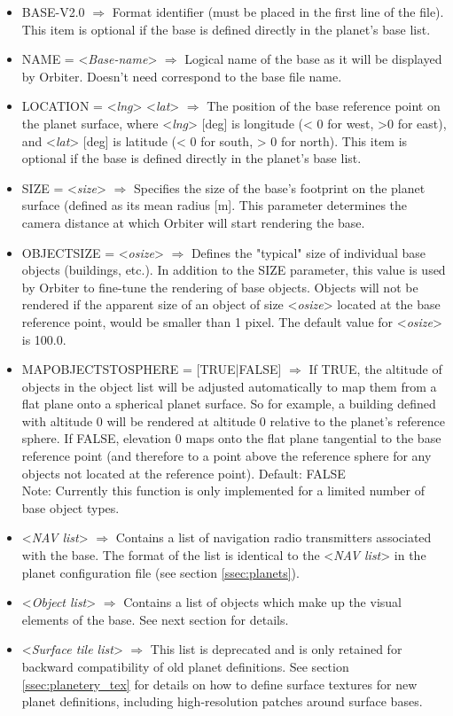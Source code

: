 \documentclass[Orbiter Developer Manual.tex]{subfiles}
\begin{document}
\begin{itemize}
\item BASE-V2.0 $\Rightarrow$ Format identifier (must be placed in the first line of the file). This item is optional if the base is defined directly in the planet's base list.
\item NAME = <\textit{Base-name}> $\Rightarrow$ Logical name of the base as it will be displayed by Orbiter. Doesn't need correspond to the base file name.
\item LOCATION = <\textit{lng}> <\textit{lat}> $\Rightarrow$ The position of the base reference point on the planet surface, where <\textit{lng}> [deg] is longitude (< 0 for west, >0 for east), and <\textit{lat}> [deg] is latitude (< 0 for south, > 0 for north). This item is optional if the base is defined directly in the planet's base list.
\item SIZE = <\textit{size}> $\Rightarrow$ Specifies the size of the base's footprint on the planet surface (defined as its mean radius [m]. This parameter determines the camera distance at which Orbiter will start rendering the base.
\item OBJECTSIZE = <\textit{osize}> $\Rightarrow$ Defines the "typical" size of individual base objects (buildings, etc.). In addition to the SIZE parameter, this value is used by Orbiter to fine-tune the rendering of base objects. Objects will not be rendered if the apparent size of an object of size <\textit{osize}> located at the base reference point, would be smaller than 1 pixel. The default value for <\textit{osize}> is 100.0.
\item MAPOBJECTSTOSPHERE = [TRUE|FALSE] $\Rightarrow$ If TRUE, the altitude of objects in the object list will be adjusted automatically to map them from a flat plane onto a spherical planet surface. So for example, a building defined with altitude 0 will be rendered at altitude 0 relative to the planet's reference sphere. If FALSE, elevation 0 maps onto the flat plane tangential to the base reference point (and therefore to a point above the reference sphere for any objects not located at the reference point). Default: FALSE\\
Note: Currently this function is only implemented for a limited number of base object types.
\item <\textit{NAV list}> $\Rightarrow$ Contains a list of navigation radio transmitters associated with the base. The format of the list is identical to the <\textit{NAV list}> in the planet configuration file (see section \ref{ssec:planets}).
\item <\textit{Object list}> $\Rightarrow$ Contains a list of objects which make up the visual elements of the base. See next section for details.
\item <\textit{Surface tile list}> $\Rightarrow$ This list is deprecated and is only retained for backward compatibility of old planet definitions. See section \ref{ssec:planetery_tex} for details on how to define surface textures for new planet definitions, including high-resolution patches around surface bases.
\end{itemize}
\end{document}
